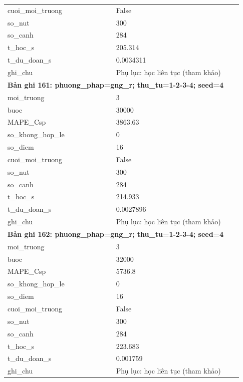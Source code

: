 \begin{longtable}{p{0.43\linewidth}p{0.50\linewidth}}
cuoi\_\allowbreak moi\_\allowbreak truong & False \\
so\_\allowbreak nut & 300 \\
so\_\allowbreak canh & 284 \\
t\_\allowbreak hoc\_\allowbreak s & 205.314 \\
t\_\allowbreak du\_\allowbreak doan\_\allowbreak s & 0.0034311 \\
ghi\_\allowbreak chu & Phụ lục: học liên tục (tham khảo) \\
\midrule
\multicolumn{2}{p{0.95\linewidth}}{\textbf{Bản ghi 161: phuong\_phap=gng\_r; thu\_tu=1-2-3-4; seed=4}} \\
moi\_\allowbreak truong & 3 \\
buoc & 30000 \\
MAPE\_\allowbreak Csp & 3863.63 \\
so\_\allowbreak khong\_\allowbreak hop\_\allowbreak le & 0 \\
so\_\allowbreak diem & 16 \\
cuoi\_\allowbreak moi\_\allowbreak truong & False \\
so\_\allowbreak nut & 300 \\
so\_\allowbreak canh & 284 \\
t\_\allowbreak hoc\_\allowbreak s & 214.933 \\
t\_\allowbreak du\_\allowbreak doan\_\allowbreak s & 0.0027896 \\
ghi\_\allowbreak chu & Phụ lục: học liên tục (tham khảo) \\
\midrule
\multicolumn{2}{p{0.95\linewidth}}{\textbf{Bản ghi 162: phuong\_phap=gng\_r; thu\_tu=1-2-3-4; seed=4}} \\
moi\_\allowbreak truong & 3 \\
buoc & 32000 \\
MAPE\_\allowbreak Csp & 5736.8 \\
so\_\allowbreak khong\_\allowbreak hop\_\allowbreak le & 0 \\
so\_\allowbreak diem & 16 \\
cuoi\_\allowbreak moi\_\allowbreak truong & False \\
so\_\allowbreak nut & 300 \\
so\_\allowbreak canh & 284 \\
t\_\allowbreak hoc\_\allowbreak s & 223.683 \\
t\_\allowbreak du\_\allowbreak doan\_\allowbreak s & 0.001759 \\
ghi\_\allowbreak chu & Phụ lục: học liên tục (tham khảo) \\

\end{longtable}
